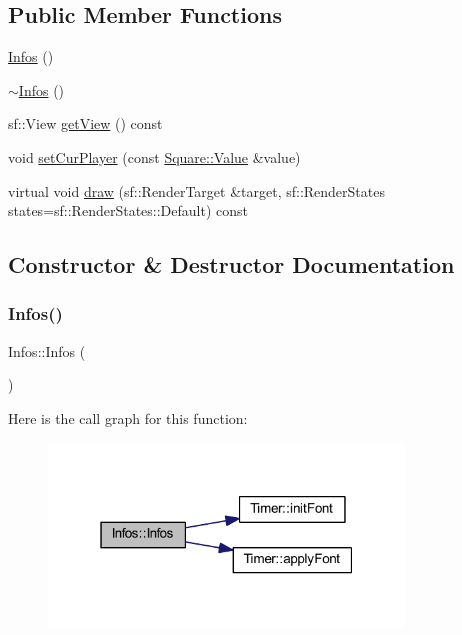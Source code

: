 \subsection*{Public Member Functions}
\begin{DoxyCompactItemize}
\item 
\hyperlink{class_infos_a0032935a2fbfcd006ffd71d90a74c4cf}{Infos} ()
\item 
\hyperlink{class_infos_a98973ef2400dabed724a65e1fe319f46}{$\sim$\+Infos} ()
\item 
sf\+::\+View \hyperlink{class_infos_af68a0d5dafcc767ae4b2b46ac8d7fbe2}{get\+View} () const
\item 
void \hyperlink{class_infos_a5dee8a8817c307c570db905429480d79}{set\+Cur\+Player} (const \hyperlink{class_square_a7feeec236c037a9849114226adaa4ecc}{Square\+::\+Value} \&value)
\item 
virtual void \hyperlink{class_infos_af7a440e4bc838e7b3251cbd20c7ad0ae}{draw} (sf\+::\+Render\+Target \&target, sf\+::\+Render\+States states=sf\+::\+Render\+States\+::\+Default) const
\end{DoxyCompactItemize}


\subsection{Constructor \& Destructor Documentation}
\mbox{\label{class_infos_a0032935a2fbfcd006ffd71d90a74c4cf}} 
\subsubsection{\texorpdfstring{Infos()}{Infos()}}
{\footnotesize\ttfamily Infos\+::\+Infos (\begin{DoxyParamCaption}{ }\end{DoxyParamCaption})}

Here is the call graph for this function\+:
\nopagebreak
\begin{figure}[H]
\begin{center}
\leavevmode
\includegraphics[width=268pt]{class_infos_a0032935a2fbfcd006ffd71d90a74c4cf_cgraph}
\end{center}
\end{figure}
\mbox{\label{class_infos_a98973ef2400dabed724a65e1fe319f46}} 
